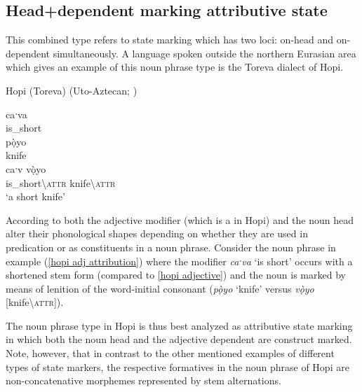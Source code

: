 \subsection{Head+dependent marking attributive state}
This combined type refers to state marking which has two loci: on-head and on-dependent simultaneously. A language spoken outside the northern Eurasian area which gives an example of this noun phrase type is the Toreva dialect of Hopi.
\begin{exe}
\ex 
\rm{Hopi (Toreva) (Uto-Aztecan; \citealt{whorf1946})}
\begin{xlist}
\ex	\label{hopi adjective}
\gll caˑva\\
	is\_short\\
\ex	
\gll pọ̀yo\\
	knife\\
\ex	\label{hopi adj attribution}
\gll caˑv vọ̀yo\\
 	is\_short\textbackslash\textsc{attr} knife\textbackslash\textsc{attr}\\
\glt	‘a short knife’
\end{xlist}
\end{exe}
According to \citet[178]{whorf1946} both the adjective modifier (which is a  in Hopi) and the noun head alter their phonological shapes depending on whether they are used in predication or as constituents in a noun phrase. Consider the noun phrase in example (\ref{hopi adj attribution}) where the modifier \textit{caˑva} ‘is short’ occurs with a shortened stem form (compared to \ref{hopi adjective}) and the noun is marked by means of lenition of the word-initial consonant (\textit{pọ̀yo} ‘knife’ versus \textit{vọ̀yo} [knife\textbackslash\textsc{attr}]).

The noun phrase type in Hopi is thus best analyzed as attributive state marking in which both the noun head and the adjective dependent are construct marked. Note, however, that in contrast to the other mentioned examples of different types of state markers, the respective formatives in the noun phrase of Hopi are non-concatenative morphemes represented by stem alternations.

